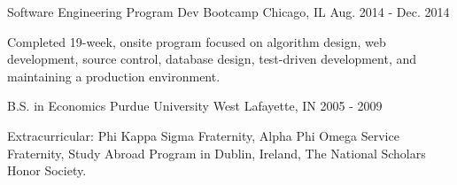 

\begin{cventries}

    \cventry
    {Software Engineering Program} %
    {Dev Bootcamp} %
    {Chicago, IL} %
    {Aug. 2014 - Dec. 2014} %
    {
        \begin{cvitems} %
            \item {Completed 19-week, onsite program focused on algorithm design, web development, source control, database design, test-driven development, and maintaining a production environment.}
        \end{cvitems}
    }

    \cventry
    {B.S. in Economics} %
    {Purdue University} %
    {West Lafayette, IN} %
    {2005 - 2009} %
    {
        \begin{cvitems} %
            \item {Extracurricular: Phi Kappa Sigma Fraternity, Alpha Phi Omega Service Fraternity, Study Abroad Program in Dublin, Ireland, The National Scholars Honor Society.}
        \end{cvitems}
    }

\end{cventries}

